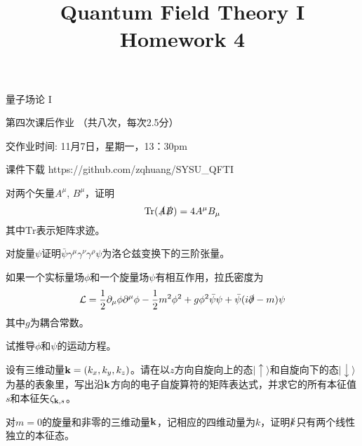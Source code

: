 \documentclass[CJK]{beamer}
\title{Quantum Field Theory I \\ Homework 4}
\author{}
\date{}
\begin{document}
\begin{frame}
 
\begin{center}
\begin{Large}
\bch
量子场论 I 

{\vskip 0.3in}

第四次课后作业 （共八次，每次2.5分）

交作业时间: 11月7日，星期一，13：30pm

\ech
\end{Large}
\end{center}

\vskip 0.2in

\bch
课件下载
\ech
https://github.com/zqhuang/SYSU\_QFTI

\end{frame}

\begin{frame}
\bch
对两个矢量$A^\mu$, $B^\mu$，证明
$$\mathrm{Tr}(\slashed{A}\slashed{B}) = 4A^\mu B_\mu$$
其中$\mathrm{Tr}$表示矩阵求迹。
\ech
\end{frame}

\begin{frame}
\bch
对旋量$\psi$证明$\bar{\psi}\gamma^\mu\gamma^\nu\gamma^\rho\psi$为洛仑兹变换下的三阶张量。
\ech
\end{frame}

\begin{frame}
\bch
如果一个实标量场$\phi$和一个旋量场$\psi$有相互作用，拉氏密度为
$${\mathcal{L}} = \frac{1}{2}\partial_\mu\phi\partial^\mu\phi - \frac{1}{2}m^2\phi^2 + g\phi^2\bar\psi\psi + \bar\psi(i\slashed{\partial}-m)\psi$$
其中$g$为耦合常数。

试推导$\phi$和$\psi$的运动方程。
\ech
\end{frame}


\begin{frame}
\bch
设有三维动量${\mathbf{k}} = (k_x, k_y, k_z)$。请在以$z$方向自旋向上的态$|\uparrow\rangle$和自旋向下的态$|\downarrow\rangle$为基的表象里，写出沿${\mathbf{k}}$方向的电子自旋算符的矩阵表达式，并求它的所有本征值$s$和本征矢$\zeta_{{\mathbf{k}},s}$。
\ech
\end{frame}


\begin{frame}
\bch
对$m=0$的旋量和非零的三维动量${\mathbf{k}}$，记相应的四维动量为$k$，证明$\slashed{k}$只有两个线性独立的本征态。 
\ech
\end{frame}
\end{document}
